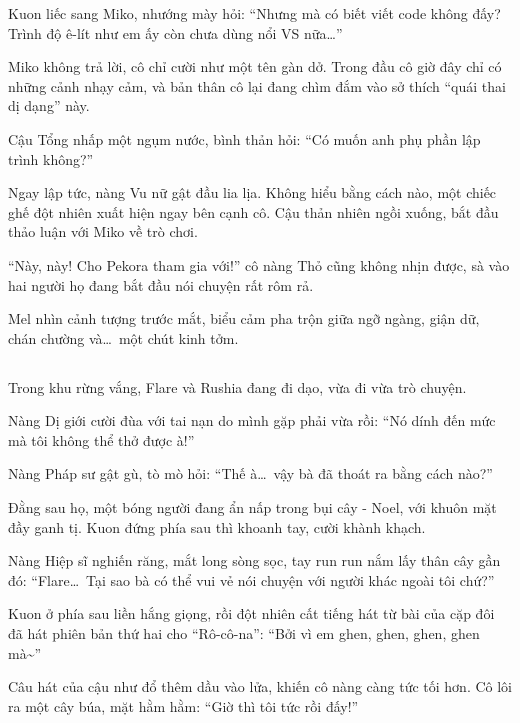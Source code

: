 \documentclass[../main.tex]{subfiles}
\begin{document}

Kuon liếc sang Miko, nhướng mày hỏi: ``Nhưng mà có biết viết code không đấy? Trình độ ê-lít như em ấy còn chưa dùng nổi VS nữa\dots''

Miko không trả lời, cô chỉ cười như một tên gàn dở. Trong đầu cô giờ đây chỉ có những cảnh nhạy cảm, và bản thân cô lại đang chìm đắm vào sở thích ``quái thai dị dạng'' này.

Cậu Tổng nhấp một ngụm nước, bình thản hỏi: ``Có muốn anh phụ phần lập trình không?''

Ngay lập tức, nàng Vu nữ gật đầu lia lịa. Không hiểu bằng cách nào, một chiếc ghế đột nhiên xuất hiện ngay bên cạnh cô. Cậu thản nhiên ngồi xuống, bắt đầu thảo luận với Miko về trò chơi.

``Này, này! Cho Pekora tham gia với!'' cô nàng Thỏ cũng không nhịn được, sà vào hai người họ đang bắt đầu nói chuyện rất rôm rả.

Mel nhìn cảnh tượng trước mắt, biểu cảm pha trộn giữa ngỡ ngàng, giận dữ, chán chường và\dots\ một chút kinh tởm.

\subsection*{\label{ep-S13.V}}

Trong khu rừng vắng, Flare và Rushia đang đi dạo, vừa đi vừa trò chuyện.

Nàng Dị giới cười đùa với tai nạn do mình gặp phải vừa rồi: ``Nó dính đến mức mà tôi không thể thở được à!''

Nàng Pháp sư gật gù, tò mò hỏi: ``Thế à\dots\ vậy bà đã thoát ra bằng cách nào?''

Đằng sau họ, một bóng người đang ẩn nấp trong bụi cây - Noel, với khuôn mặt đầy ganh tị. Kuon đứng phía sau thì khoanh tay, cười khành khạch.


Nàng Hiệp sĩ nghiến răng, mắt long sòng sọc, tay run run nắm lấy thân cây gần đó: ``Flare\dots\ Tại sao bà có thể vui vẻ nói chuyện với người khác ngoài tôi chứ?''

Kuon ở phía sau liền hắng giọng, rồi đột nhiên cất tiếng hát từ bài của cặp đôi đã hát phiên bản thứ hai cho ``Rô-cô-na'': ``Bởi vì em ghen, ghen, ghen, ghen mà\~{}''

Câu hát của cậu như đổ thêm dầu vào lửa, khiến cô nàng càng tức tối hơn. Cô lôi ra một cây búa, mặt hằm hằm: ``Giờ thì tôi tức rồi đấy!''
\end{document}
